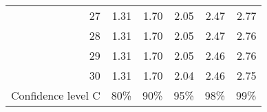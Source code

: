 \begin{center}
\begin{tabular}{r | rrr rr}
27  &  {\normalsize  1.31} & {\normalsize  1.70} & {\normalsize  2.05} & {\normalsize  2.47} & {\normalsize  2.77}  \\ 
28  &  {\normalsize  1.31} & {\normalsize  1.70} & {\normalsize  2.05} & {\normalsize  2.47} & {\normalsize  2.76}  \\ 
29  &  {\normalsize  1.31} & {\normalsize  1.70} & {\normalsize  2.05} & {\normalsize  2.46} & {\normalsize  2.76}  \\ 
30  &  {\normalsize  1.31} & {\normalsize  1.70} & {\normalsize  2.04} & {\normalsize  2.46} & {\normalsize  2.75}  \\ 
\hline
Confidence level C  &  {\normalsize  80\%} & {\normalsize 90\%} & {\normalsize 95\%} & {\normalsize  98\%} & {\normalsize  99\%}  \\
\hline
\end{tabular}
\end{center}

